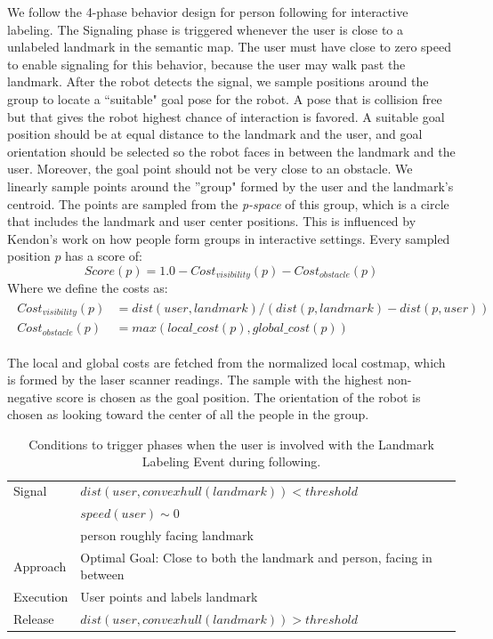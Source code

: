 \documentclass{tADR2e}
\begin{document}
We follow the 4-phase behavior design for person following for interactive labeling. The Signaling phase is triggered whenever the user is close to a unlabeled landmark in the semantic map. The user must have close to zero speed to enable signaling for this behavior, because the user may walk past the landmark. After the robot detects the signal, we sample positions around the group to locate a ``suitable" goal pose for the robot. A pose that is collision free but that gives the robot highest chance of interaction is favored. A suitable goal position should be at equal distance to the landmark and the user, and goal orientation should be selected so the robot faces in between the landmark and the user. Moreover, the goal point should not be very close to an obstacle. We linearly sample points around the ''group" formed by the user and the landmark's centroid. The points are sampled from the \textit{p-space} of this group, which is a circle that includes the landmark and user center positions. This is influenced by Kendon's work \cite{kendon1990conducting} on how people form groups in interactive settings. Every sampled position $p$ has a score of:
\[
Score(p) = 1.0 - Cost_{visibility}(p) - Cost_{obstacle}(p)
\]
Where we define the costs as:
\begin{align} 
\begin{split}
Cost_{visibility}(p)&=dist(user,landmark)/(dist(p,landmark)-dist(p,user)) \\
Cost_{obstacle}(p)&=max(local\_cost(p),global\_cost(p))
\end{split}
\end{align}

The local and global costs are fetched from the normalized local costmap, which is formed by the laser scanner readings. The sample with the highest non-negative score is chosen as the goal position. The orientation of the robot is chosen as looking toward the center of all the people in the group. 

\begin{table}[ht!]

	\caption{Conditions to trigger phases when the user is involved with the Landmark Labeling Event during following.}
    \centering
		
  \begin{tabular}{l |  m{10cm}}
    \toprule    
    Signal & {$dist(user, convex hull(landmark))<threshold$}\\       
	                           & {$speed(user)\sim 0$} \\
	                           & {person roughly facing landmark}\\ \midrule		                           		                                
    Approach & {Optimal Goal: Close to both the landmark and person, facing in between}\\       \midrule
    Execution & {User points and labels landmark}\\  \midrule
    Release & {$dist(user, convex hull(landmark))>threshold$}\\ 
    \bottomrule
  \end{tabular}
    \label{table:situation_aware_list_landmark}
\end{table}
\end{document}
